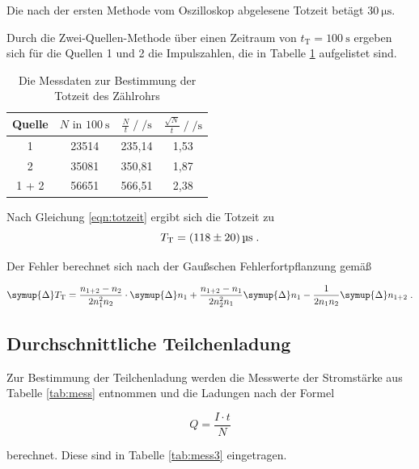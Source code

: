 Die nach der ersten Methode vom Oszilloskop abgelesene Totzeit betägt 
$\SI{30}{\micro\second}$. 

Durch die Zwei-Quellen-Methode über einen Zeitraum von
$t_\text{T} = \SI{100}{\second}$ ergeben sich für die Quellen 1 und 2
die Impulszahlen, die in Tabelle \ref{tab:mess2} aufgelistet sind.

\begin{table}
  \centering
  \caption{Die Messdaten zur Bestimmung der Totzeit des Zählrohrs}
\label{tab:mess2}
  \begin{tabular}{c c c c}
  \toprule
  Quelle & $N \text{ in } \SI{100}{\second}$ & 
  $\frac{N}{t} \;/\; \si{\per\second}$
  & $\frac{\sqrt{N}}{t} \;/\; \si{\per\second}$\\
  \midrule
  1     & 23514 & 235,14 & 1,53 \\
  2     & 35081 & 350,81 & 1,87 \\
  1 + 2 & 56651 & 566,51 & 2,38 \\
  \bottomrule
  \end{tabular}
  \end{table}

  Nach Gleichung \eqref{eqn:totzeit} ergibt sich die Totzeit zu 
  \begin{equation*}
   T_\text{T} = \SI{118 +- 20}{\micro\second} \;.
  \end{equation*}

  Der Fehler berechnet sich nach der Gaußschen Fehlerfortpflanzung gemäß

  \begin{equation}
    \symup{\Delta} T_\text{T} = \frac{n_{1+2} - n_2}{2 n_1^2 n_2} \cdot \symup{\Delta} n_1
    + \frac{n_{1+2} - n_1}{2 n_2^2 n_1} \symup{\Delta} n_1 -
    \frac{1}{2 n_1 n_2} \symup{\Delta} n_{1+2} \; .
  \end{equation}

  \subsection{Durchschnittliche Teilchenladung}

  Zur Bestimmung der Teilchenladung werden die Messwerte der Stromstärke aus Tabelle
  \ref{tab:mess} entnommen und die Ladungen nach der Formel

  \begin{equation}
    Q = \frac{I \cdot t}{N}
  \end{equation}

  berechnet. Diese sind in Tabelle \ref{tab:mess3} eingetragen.

